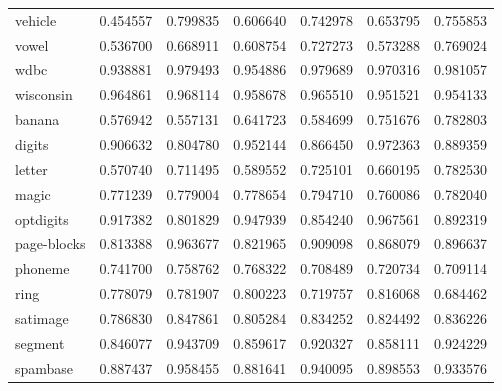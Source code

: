\begin{tabular}{lrrrrrr}
vehicle         &         0.454557 &  0.799835 &                  0.606640 &       0.742978 &                  0.653795 &       0.755853 \\
vowel           &         0.536700 &  0.668911 &                  0.608754 &       0.727273 &                  0.573288 &       0.769024 \\
wdbc            &         0.938881 &  0.979493 &                  0.954886 &       0.979689 &                  0.970316 &       0.981057 \\
wisconsin       &         0.964861 &  0.968114 &                  0.958678 &       0.965510 &                  0.951521 &       0.954133 \\
banana          &         0.576942 &  0.557131 &                  0.641723 &       0.584699 &                  0.751676 &       0.782803 \\
digits          &         0.906632 &  0.804780 &                  0.952144 &       0.866450 &                  0.972363 &       0.889359 \\
letter          &         0.570740 &  0.711495 &                  0.589552 &       0.725101 &                  0.660195 &       0.782530 \\
magic           &         0.771239 &  0.779004 &                  0.778654 &       0.794710 &                  0.760086 &       0.782040 \\
optdigits       &         0.917382 &  0.801829 &                  0.947939 &       0.854240 &                  0.967561 &       0.892319 \\
page-blocks     &         0.813388 &  0.963677 &                  0.821965 &       0.909098 &                  0.868079 &       0.896637 \\
phoneme         &         0.741700 &  0.758762 &                  0.768322 &       0.708489 &                  0.720734 &       0.709114 \\
ring            &         0.778079 &  0.781907 &                  0.800223 &       0.719757 &                  0.816068 &       0.684462 \\
satimage        &         0.786830 &  0.847861 &                  0.805284 &       0.834252 &                  0.824492 &       0.836226 \\
segment         &         0.846077 &  0.943709 &                  0.859617 &       0.920327 &                  0.858111 &       0.924229 \\
spambase        &         0.887437 &  0.958455 &                  0.881641 &       0.940095 &                  0.898553 &       0.933576 \\

\end{tabular}
